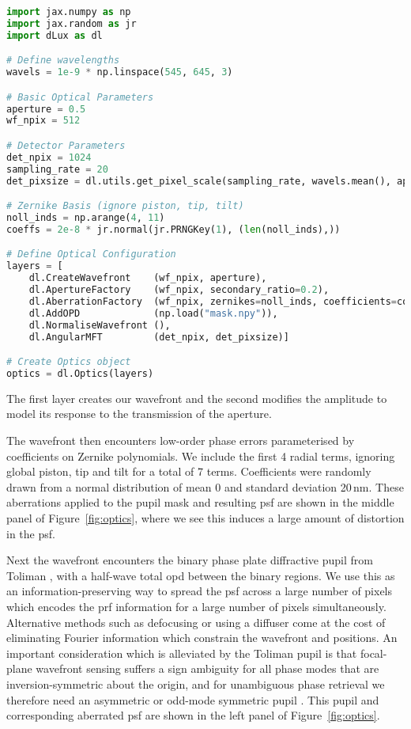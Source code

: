 \documentclass[]{spieman}
\begin{document}
\begin{lstlisting}[language=Python,frame=single]
import jax.numpy as np
import jax.random as jr
import dLux as dl

# Define wavelengths
wavels = 1e-9 * np.linspace(545, 645, 3)

# Basic Optical Parameters
aperture = 0.5
wf_npix = 512

# Detector Parameters
det_npix = 1024
sampling_rate = 20
det_pixsize = dl.utils.get_pixel_scale(sampling_rate, wavels.mean(), aperture)

# Zernike Basis (ignore piston, tip, tilt)
noll_inds = np.arange(4, 11)
coeffs = 2e-8 * jr.normal(jr.PRNGKey(1), (len(noll_inds),))

# Define Optical Configuration
layers = [
    dl.CreateWavefront    (wf_npix, aperture),
    dl.ApertureFactory    (wf_npix, secondary_ratio=0.2),
    dl.AberrationFactory  (wf_npix, zernikes=noll_inds, coefficients=coeffs),
    dl.AddOPD             (np.load("mask.npy")),
    dl.NormaliseWavefront (),
    dl.AngularMFT         (det_npix, det_pixsize)]

# Create Optics object
optics = dl.Optics(layers)
\end{lstlisting}

The first layer creates our wavefront and the second modifies the amplitude to model its response to the transmission of the aperture.

The wavefront then encounters low-order phase errors parameterised by coefficients on Zernike polynomials. We include the first 4 radial terms, ignoring global piston, tip and tilt for a total of 7 terms. Coefficients were randomly drawn from a normal distribution of mean 0 and standard deviation 20\,nm. %
These aberrations applied to the pupil mask and resulting \ac{psf} are shown in the middle panel of Figure~\ref{fig:optics}, where we see this induces a large amount of distortion in the \ac{psf}.

Next the wavefront encounters the binary phase plate diffractive pupil from Toliman \cite{tuthill2018}, with a half-wave total \ac{opd} between the binary regions. We use this as an information-preserving way to spread the \ac{psf} across a large number of pixels which encodes the \ac{prf} information for a large number of pixels simultaneously. Alternative methods such as defocusing or using a diffuser \cite{Stefansson2017} come at the cost of eliminating Fourier information which constrain the wavefront and positions. An important consideration which is alleviated by the Toliman pupil is that focal-plane wavefront sensing suffers a sign ambiguity for all phase modes that are inversion-symmetric about the origin, and for unambiguous phase retrieval we therefore need an asymmetric or odd-mode symmetric pupil \cite{Martinache2013}. This pupil and corresponding aberrated \ac{psf} are shown in the left panel of Figure~\ref{fig:optics}.
\end{document}
